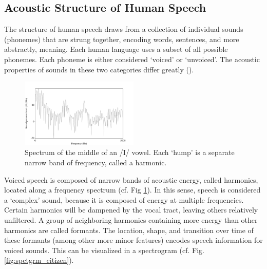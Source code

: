 

\subsection{Acoustic Structure of Human Speech}

The structure of human speech draws from a collection of individual sounds (phonemes) that are strung together, encoding words, sentences, and more abstractly, meaning.  Each human language uses a subset of all possible phonemes.  Each phoneme is either considered `voiced' or `unvoiced'.  The acoustic properties of sounds in these two categories differ greatly (\cite{ladefoged:14}).


%
\begin{figure}
\centering
  \includegraphics[width=0.5\textwidth]{figure/spctrm5k.png}
  \caption{Spectrum of the middle of an /I/ vowel.  Each `hump' is a separate narrow band of frequency, called a harmonic.}
  \label{fig:spctrm5k}
\end{figure}
%
Voiced speech is composed of narrow bands of acoustic energy, called harmonics, located along a frequency spectrum (cf. Fig \ref{fig:spctrm5k}).  In this sense, speech is considered a `complex' sound, because it is composed of energy at multiple frequencies.  Certain harmonics will be dampened by the vocal tract, leaving others relatively unfiltered.  A group of neighboring harmonics containing more energy than other harmonics are called formants.  The location, shape, and transition over time of these formants (among other more minor features) encodes speech information for voiced sounds.  This can be visualized in a spectrogram (cf. Fig. \ref{fig:spctgrm_citizen}).


